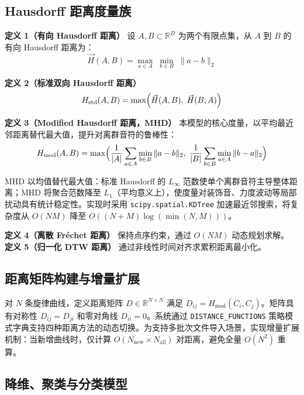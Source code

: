 \documentclass[withoutpreface]{cumcmthesis}
\begin{document}
\subsection{Hausdorff 距离度量族}

\textbf{定义 1（有向 Hausdorff 距离）}
设 $A, B \subset \mathbb{R}^D$ 为两个有限点集，从 $A$ 到 $B$ 的有向 Hausdorff 距离为：
\begin{equation}
    \vec{H}(A, B) = \max_{a \in A}\; \min_{b \in B}\; \|a - b\|_2
    \label{eq:directed}
\end{equation}

\textbf{定义 2（标准双向 Hausdorff 距离）}
\begin{equation}
    H_{\text{std}}(A, B) = \max\Bigl(\vec{H}(A, B),\; \vec{H}(B, A)\Bigr)
    \label{eq:standard}
\end{equation}

\textbf{定义 3（Modified Hausdorff 距离，MHD）}
本模型的核心度量，以平均最近邻距离替代最大值，提升对离群音符的鲁棒性：
\begin{equation}
    H_{\text{mod}}(A, B) = \max\Bigl(\frac{1}{|A|}\sum_{a \in A} \min_{b \in B} \|a - b\|_2,\; \frac{1}{|B|}\sum_{b \in B} \min_{a \in A} \|b - a\|_2\Bigr)
    \label{eq:modified}
\end{equation}

MHD 以均值替代最大值：标准 Hausdorff 的 $L_\infty$ 范数使单个离群音符主导整体距离；MHD 将聚合范数降至 $L_1$（平均意义上），使度量对装饰音、力度波动等局部扰动具有统计稳定性。实现时采用 \texttt{scipy.spatial.KDTree} 加速最近邻搜索，将复杂度从 $O(NM)$ 降至 $O((N+M)\log(\min(N,M)))$。

\textbf{定义 4（离散 Fr\'{e}chet 距离）} 保持点序约束，通过 $O(NM)$ 动态规划求解。
\textbf{定义 5（归一化 DTW 距离）} 通过非线性时间对齐求累积距离最小化。

\subsection{距离矩阵构建与增量扩展}

对 $N$ 条旋律曲线，定义距离矩阵 $D \in \mathbb{R}^{N \times N}$ 满足 $D_{ij} = H_{\text{mod}}(C_i, C_j)$。矩阵具有对称性 $D_{ij} = D_{ji}$ 和零对角线 $D_{ii} = 0$。系统通过 \texttt{DISTANCE\_FUNCTIONS} 策略模式字典支持四种距离方法的动态切换。为支持多批次文件导入场景，实现增量扩展机制：当新增曲线时，仅计算 $O(N_{\text{new}} \times N_{\text{all}})$ 对距离，避免全量 $O(N^2)$ 重算。

\subsection{降维、聚类与分类模型}
\end{document}
